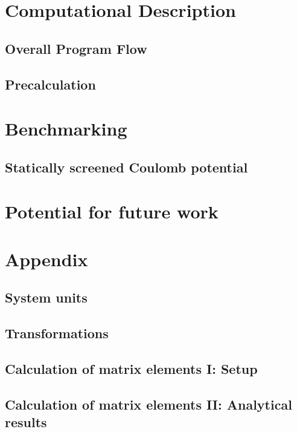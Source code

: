 \documentclass[12pt]{report}
\begin{document}
\chapter{Computational Description}
    \section{Overall Program Flow}
    \label{section:overall}
        
    \section{Precalculation}
    \label{section:precalculation}
        

\chapter{Benchmarking}
\label{chapter:results}
    \section{Statically screened Coulomb potential}
        

\chapter{Potential for future work}

\appendix
\chapter*{Appendix}
\renewcommand{\thesection}{\Alph{section}}
\renewcommand{\theequation}{\Alph{section}.\arabic{equation}}
    \section{System units}
    \label{appendix:units}
        
        \pagebreak
    \section{Transformations}
    \label{appendix:transformations}
        
        \pagebreak
    \section{Calculation of matrix elements I: Setup}
    \label{appendix:elements}
        
        \pagebreak
    \section{Calculation of matrix elements II: Analytical results}
    \label{appendix:elements}
        
        \pagebreak



\end{document}
